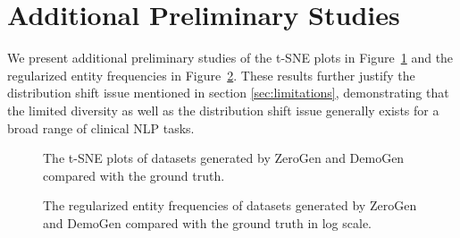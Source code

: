 \documentclass{article} %
\begin{document}
\section{Additional Preliminary Studies}
\label{sec:add_prelim}
We present additional preliminary studies of the t-SNE plots in Figure~\ref{fig:add_prelim_tsne} and the regularized entity frequencies in Figure~\ref{fig:add_prelim_freq}.
These results further justify the distribution shift issue mentioned in section \ref{sec:limitations}, demonstrating that the limited diversity as well as the distribution shift issue generally exists for a broad range of clinical NLP tasks.
\clearpage
 \begin{figure}[H]
	\centering
	\caption{The t-SNE plots of datasets generated by ZeroGen and DemoGen compared with the ground truth.}
\label{fig:add_prelim_tsne}
\end{figure}

 \begin{figure}[H]
	\centering
	\vspace{-2ex}
	\caption{The regularized entity frequencies of datasets generated by ZeroGen and DemoGen compared with the ground truth in log scale.}
\label{fig:add_prelim_freq}
\end{figure}
\end{document}

